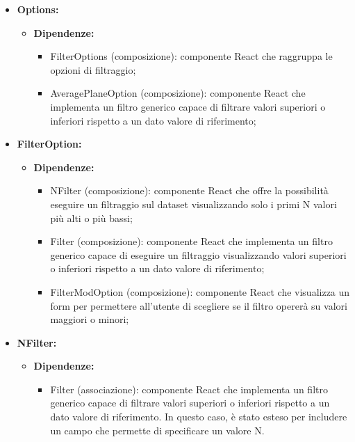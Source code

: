 \begin{itemize}
    \item \textbf{Options:}
    \begin{itemize}
        \item \textbf{Dipendenze:}
        \begin{itemize}
            \item FilterOptions (composizione): componente React che raggruppa le opzioni di filtraggio;
            \item AveragePlaneOption (composizione): componente React che implementa un filtro generico capace di filtrare valori superiori o inferiori rispetto a un dato valore di riferimento;
        \end{itemize} 
    \end{itemize}

    \item \textbf{FilterOption:}
    \begin{itemize}
        \item \textbf{Dipendenze:}
        \begin{itemize}
            \item NFilter (composizione): componente React che offre la possibilità eseguire un filtraggio sul dataset visualizzando solo i primi N valori più alti o più bassi;
            \item Filter (composizione): componente React che implementa un filtro generico capace di  eseguire un filtraggio visualizzando valori superiori o inferiori rispetto a un dato valore di riferimento;
            \item FilterModOption (composizione): componente React che visualizza un form per permettere all'utente di scegliere se il filtro opererà su valori maggiori o minori;
        \end{itemize} 
    \end{itemize}

    \item \textbf{NFilter:}
    \begin{itemize}
        \item \textbf{Dipendenze:}
        \begin{itemize}
            \item Filter (associazione): componente React che implementa un filtro generico capace di filtrare valori superiori o inferiori rispetto a un dato valore di riferimento.
            In questo caso, è stato esteso per includere un campo che permette di specificare un valore N.
        \end{itemize} 
    \end{itemize}
\end{itemize}

